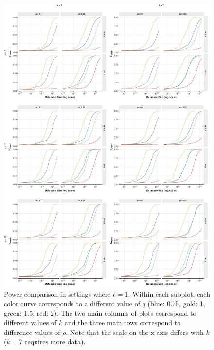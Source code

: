 \documentclass[USenglish,oneside]{article}
\newcounter{ag}
\newcounter{ab}
\newcounter{ar}
\begin{document}
\begin{figure}[h]
\centering
\includegraphics[width=\linewidth]{images/par-plot-2.png}
\caption{Power comparison in settings where $\epsilon = 1$. Within each subplot,
each color curve corresponds to a different value of $q$ (blue: 0.75, gold: 1,
green: 1.5, red: 2). The two main columns
of plots correspond to different values of $k$ and the three main rows correspond
to difference values of $\rho$. Note that the scale on the x-axis differs with $k$
($k = 7$ requires more data).}\label{fig:par-plot-2}
\end{figure}
\end{document}
